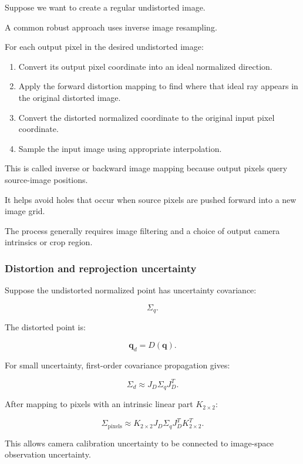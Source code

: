 Suppose we want to create a regular undistorted image.

A common robust approach uses inverse image resampling.

For each output pixel in the desired undistorted image:

\begin{enumerate}
\def\labelenumi{\arabic{enumi}.}
\tightlist
\item
  Convert its output pixel coordinate into an ideal normalized direction.
\item
  Apply the forward distortion mapping to find where that ideal ray appears in the original distorted image.
\item
  Convert the distorted normalized coordinate to the original input pixel coordinate.
\item
  Sample the input image using appropriate interpolation.
\end{enumerate}

This is called inverse or backward image mapping because output pixels query source-image positions.

It helps avoid holes that occur when source pixels are pushed forward into a new image grid.

The process generally requires image filtering and a choice of output camera intrinsics or crop region.

\subsubsection{Distortion and reprojection uncertainty}\label{distortion-and-reprojection-uncertainty}

Suppose the undistorted normalized point has uncertainty covariance:

\[
 \Sigma_q.
\]

The distorted point is:

\[
 \mathbf q_d=D(\mathbf q).
\]

For small uncertainty, first-order covariance propagation gives:

\[
 \boxed{ \Sigma_d\approx J_D\Sigma_qJ_D^T }.
\]

After mapping to pixels with an intrinsic linear part \(K_{2\times2}\):

\[
 \boxed{ \Sigma_{\mathrm{pixels}} \approx K_{2\times2} J_D\Sigma_qJ_D^T K_{2\times2}^T }.
\]

This allows camera calibration uncertainty to be connected to image-space observation uncertainty.

